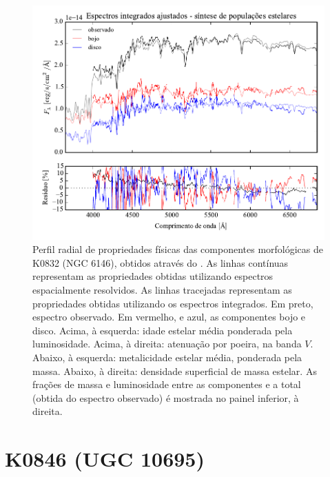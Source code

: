 \begin{figure}
	\includegraphics[page=10]{figuras/sample006a_synthesis}
	\caption[Propriedades físicas das componentes morfológicas de K0832 (NGC 6146)]
	{Perfil radial de propriedades físicas das componentes morfológicas de
	K0832 (NGC 6146), obtidos através do \starlight. As linhas contínuas
	representam as propriedades obtidas utilizando espectros espacialmente
	resolvidos. As linhas tracejadas representam as propriedades obtidas utilizando
	os espectros integrados. Em preto, espectro observado. Em vermelho, e azul, as
	componentes bojo e disco. Acima, à esquerda: idade estelar média ponderada pela
	luminosidade. Acima, à direita: atenuação por poeira, na banda $V$. Abaixo, à
	esquerda: metalicidade estelar média, ponderada pela massa. Abaixo, à direita:
	densidade superficial de massa estelar. As frações de massa e luminosidade
	entre as componentes e a total (obtida do espectro observado) é mostrada no
	painel inferior, à direita.}
	\label{fig:decompSinteseRadprof:K0832}
\end{figure}


\section{K0846 (UGC 10695)}
\label{apendice:Decomp:K0846}

